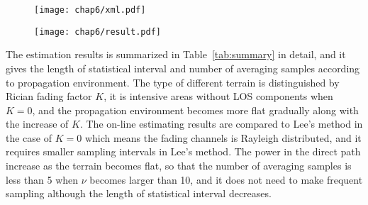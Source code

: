 \begin{figure}[!htp]
\centering
\texttt{[image: chap6/xml.pdf]}
\end{figure}

\begin{figure}[!htp]
\centering
\texttt{[image: chap6/result.pdf]}
\end{figure}

The estimation results is summarized in Table~\ref{tab:summary} in detail, and it gives the length of statistical interval and number of averaging samples according to propagation environment. The type of different terrain is distinguished by Rician fading factor $K$, it is intensive areas without LOS components when $K=0$, and the propagation environment becomes more flat gradually along with the increase of $K$. The on-line estimating results are compared to Lee's method in the case of $K=0$ which means the fading channels is Rayleigh distributed, and it requires smaller sampling intervals in Lee's method. The power in the direct path increase as the terrain becomes flat, so that the number of averaging samples is less than 5 when $\nu$ becomes larger than 10, and it does not need to make frequent sampling although the length of statistical interval decreases.

%


